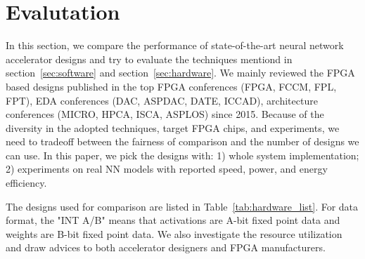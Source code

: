 \section{Evalutation}\label{sec:evaluation}

In this section, we compare the performance of state-of-the-art neural network accelerator designs and try to evaluate the techniques mentiond in section~\ref{sec:software} and section~\ref{sec:hardware}. We mainly reviewed the FPGA based designs published in the top FPGA conferences (FPGA, FCCM, FPL, FPT), EDA conferences (DAC, ASPDAC, DATE, ICCAD), architecture conferences (MICRO, HPCA, ISCA, ASPLOS) since 2015. Because of the diversity in the adopted techniques, target FPGA chips, and experiments, we need to tradeoff between the fairness of comparison and the number of designs we can use. In this paper, we pick the designs with: 1) whole system implementation; 2) experiments on real NN models with reported speed, power, and energy efficiency. 

The designs used for comparison are listed in Table~\ref{tab:hardware_list}. For data format, the "INT A/B" means that activations are A-bit fixed point data and weights are B-bit fixed point data. We also investigate the resource utilization and draw advices to both accelerator designers and FPGA manufacturers.



